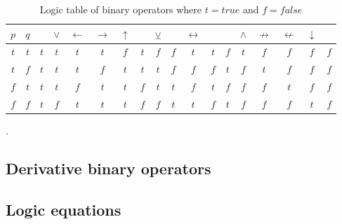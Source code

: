                 \begin{table}[h!]
                    \centering
                    \begin{tabular}{|c|c||c|c|c|c|c|c|c|c|c|c|c|c|c|c|c|c|}
                    	\hline
                    	$p$ & $q$ &     & $\vee$ & $\leftarrow$ & $\rightarrow$ & $\uparrow$ &     & $\veebar$ &     & $\leftrightarrow$ &     &     & $\wedge$ & $\not\rightarrow$ & $\not\leftarrow$ & $\downarrow$ &     \\ \hline
                    	$t$ & $t$ & $t$ &  $t$   &     $t$      &      $t$      &    $f$     & $t$ &    $f$    & $f$ &        $t$        & $t$ & $f$ &   $t$    &        $f$        &       $f$        &     $f$      & $f$ \\ \hline
                    	$t$ & $f$ & $t$ &  $t$   &     $t$      &      $f$      &    $t$     & $t$ &    $t$    & $f$ &        $f$        & $f$ & $t$ &   $f$    &        $t$        &       $f$        &     $f$      & $f$ \\ \hline
                    	$f$ & $t$ & $t$ &  $t$   &     $f$      &      $t$      &    $t$     & $f$ &    $t$    & $t$ &        $f$        & $t$ & $f$ &   $f$    &        $f$        &       $t$        &     $f$      & $f$ \\ \hline
                    	$f$ & $f$ & $t$ &  $f$   &     $t$      &      $t$      &    $t$     & $f$ &    $f$    & $t$ &        $t$        & $f$ & $t$ &   $f$    &        $f$        &       $f$        &     $t$      & $f$ \\ \hline
                    \end{tabular} 
                    \caption{Logic table of binary operators where $t=true$ and $f=false$}. 
                    \label{LogicTable:BinaryOperators}
                \end{table}
            
            
                
                
        \subsection{Derivative binary operators}
            
            
        
        
        \subsection{Logic equations}
        
        
